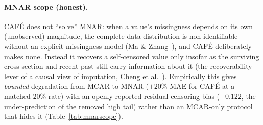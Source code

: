 \documentclass[10pt,twocolumn]{article}
\newcommand{\cafe}{CAF\'E}
\begin{document}
\paragraph{MNAR scope (honest).} \cafe{} does not ``solve'' MNAR: when a value's
missingness depends on its own (unobserved) magnitude, the complete-data
distribution is non-identifiable without an explicit missingness model
(Ma \& Zhang~\cite{ma2021mnar}), and \cafe{} deliberately makes none. Instead it
recovers a self-censored value only insofar as the surviving cross-section and
recent past still carry information about it (the recoverability lever of a causal
view of imputation, Cheng et al.~\cite{cheng2025causalview}). Empirically this
gives \emph{bounded} degradation from MCAR to MNAR ($+20\%$ MAE for \cafe{} at a
matched $20\%$ rate) with an openly reported residual censoring bias ($-0.122$,
the under-prediction of the removed high tail) rather than an MCAR-only protocol
that hides it (Table~\ref{tab:mnarscope}).

\end{document}
